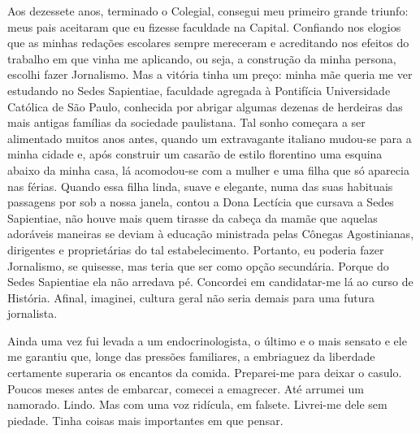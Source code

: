 Aos dezessete anos, terminado o Colegial, consegui meu primeiro grande triunfo: meus pais aceitaram que eu fizesse faculdade na Capital.
Confiando nos elogios que as minhas redações escolares sempre mereceram e acreditando nos efeitos do trabalho em que vinha me aplicando, ou seja, a construção da minha persona, escolhi fazer Jornalismo.
Mas a vitória tinha um preço: minha mãe queria me ver estudando no Sedes Sapientiae, faculdade agregada à Pontifícia Universidade Católica de São Paulo, conhecida por abrigar algumas dezenas de herdeiras das mais antigas famílias da sociedade paulistana.
Tal sonho começara a ser alimentado muitos anos antes, quando um extravagante italiano mudou-se para a minha cidade e, após construir um casarão de estilo florentino uma esquina abaixo da minha casa, lá acomodou-se com a mulher e uma filha que só aparecia nas férias.
Quando essa filha linda, suave e elegante, numa das suas habituais passagens por sob a nossa janela, contou a Dona Lectícia que cursava a Sedes Sapientiae, não houve mais quem tirasse da cabeça da mamãe que aquelas adoráveis maneiras se deviam à educação ministrada pelas Cônegas Agostinianas, dirigentes e proprietárias do tal estabelecimento.
Portanto, eu poderia fazer Jornalismo, se quisesse, mas teria que ser como opção secundária.
Porque do Sedes Sapientiae ela não arredava pé.
Concordei em candidatar-me lá ao curso de História.
Afinal, imaginei, cultura geral não seria demais para uma futura jornalista.

Ainda uma vez fui levada a um endocrinologista, o último e o mais sensato e ele me garantiu que, longe das pressões familiares, a embriaguez da liberdade certamente superaria os encantos da comida.
Preparei-me para deixar o casulo.
Poucos meses antes de embarcar, comecei a emagrecer.
Até arrumei um namorado.
Lindo.
Mas com uma voz ridícula, em falsete.
Livrei-me dele sem piedade.
Tinha coisas mais importantes em que pensar.
